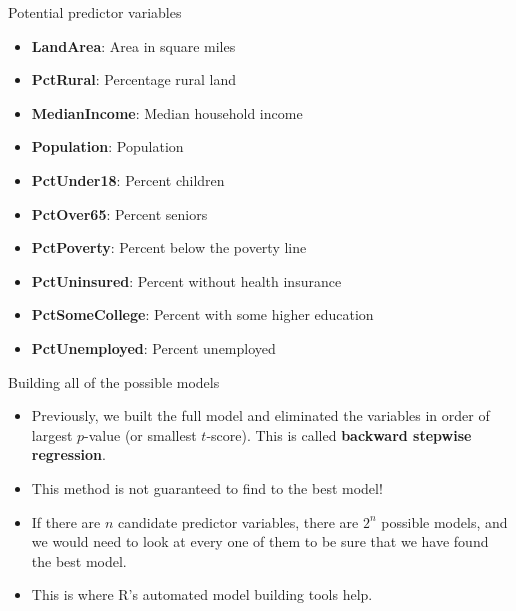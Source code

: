 \documentclass{beamer}\usepackage[]{graphicx}\usepackage[]{color}
\makeatletter
\newcommand{\hlnum}[1]{\textcolor[rgb]{0.824,0.412,0.118}{#1}}%
\newcommand{\hlcom}[1]{\textcolor[rgb]{0.824,0.706,0.549}{#1}}%
\newcommand{\hlopt}[1]{\textcolor[rgb]{1,0.894,0.769}{#1}}%
\newcommand{\hlstd}[1]{\textcolor[rgb]{1,0.894,0.769}{#1}}%
\newcommand{\hlkwd}[1]{\textcolor[rgb]{1,0.78,0.769}{#1}}%
\newenvironment{kframe}{%
 \def\at@end@of@kframe{}%
 \ifinner\ifhmode%
  \def\at@end@of@kframe{\end{minipage}}%
  \begin{minipage}{\columnwidth}%
 \fi\fi%
 \def\FrameCommand##1{\hskip\@totalleftmargin \hskip-\fboxsep
 \colorbox{shadecolor}{##1}\hskip-\fboxsep
     \hskip-\linewidth \hskip-\@totalleftmargin \hskip\columnwidth}%
 \MakeFramed {\advance\hsize-\width
   \@totalleftmargin\z@ \linewidth\hsize
   \@setminipage}}%
 {\par\unskip\endMakeFramed%
 \at@end@of@kframe}
\newenvironment{knitrout}{}{} %
\makeatother
\begin{document}
\begin{darkframes}

    \begin{frame}[fragile]{Potential predictor variables}
      \begin{itemize}
        \item \textbf{LandArea}:       Area in square miles
        \item \textbf{PctRural}:       Percentage rural land
        \item \textbf{MedianIncome}:   Median household income
        \item \textbf{Population}:     Population
        \item \textbf{PctUnder18}:     Percent children
        \item \textbf{PctOver65}:      Percent seniors
        \item \textbf{PctPoverty}:     Percent below the poverty line
        \item \textbf{PctUninsured}:   Percent without health insurance
        \item \textbf{PctSomeCollege}: Percent with some higher education
        \item \textbf{PctUnemployed}:  Percent unemployed
      \end{itemize}
    \end{frame}

    \begin{frame}{Building all of the possible models}
      \begin{itemize}[<+->]
        \item Previously, we built the full model and eliminated the variables in order of largest 
        $p$-value (or smallest $t$-score). This is called \textbf{backward stepwise regression}.
        \item This method is not guaranteed to find to the best model!
        \item If there are $n$ candidate predictor variables, there are $2^n$ possible models, and we would need to look at every one of them to be sure that we have found the best model.
        \item This is where R's automated model building tools help.
      \end{itemize} 
    \end{frame}


\end{darkframes}
\end{document}
